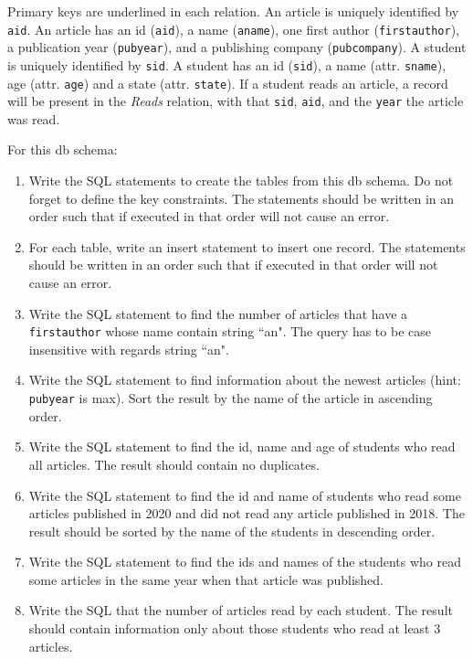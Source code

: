 \documentclass[letterpaper, 11pt]{article}
\begin{document}
Primary keys are underlined in each relation. An article is uniquely identified by \texttt{aid}. An article has an id (\texttt{aid}), a name (\texttt{aname}), one first author (\texttt{first\textunderscore author}), a publication year (\texttt{pubyear}), and a publishing company (\texttt{pubcompany}). A student is uniquely identified by \texttt{sid}. A student has an id (\texttt{sid}), a name (attr. \texttt{sname}), age (attr. \texttt{age}) and a state (attr. \texttt{state}). If a student reads an article, a record will be present in the \textit{Reads} relation, with that \texttt{sid}, \texttt{aid}, and the \texttt{year} the article was read.

For this db schema:
\begin{enumerate}[label={\alph*}),leftmargin=*]
    \item Write the SQL statements to create the tables from this db schema. Do not forget to define the key constraints. The statements should be written in an order such that if executed in that order will not cause an error.
    \item For each table, write an insert statement to insert one record. The statements should be written in an order such that if executed in that order will not cause an error.
    \item Write the SQL statement to find the number of articles that have a \texttt{first\textunderscore author} whose name contain string ``an". The query has to be case insensitive with regards string ``an".
    \item Write the SQL statement to find information about the newest articles (hint: \texttt{pubyear} is max). Sort the result by the name of the article in ascending order.
    \item Write the SQL statement to find the id, name and age of students who read all articles. The result should contain no duplicates.
    \item Write the SQL statement to find the id and name of students who read some articles published in 2020 and did not read any article published in 2018. The result should be sorted by the name of the students in descending order.
    \item Write the SQL statement to find the ids and names of the students who read some articles in the same year when that article was published.
    \item Write the SQL that the number of articles read by each student. The result should contain information only about those students who read at least 3 articles.

\end{enumerate}
\end{document}
